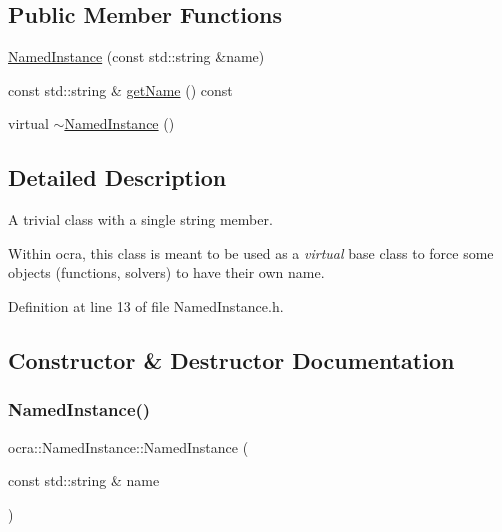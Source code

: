 \subsection*{Public Member Functions}
\begin{DoxyCompactItemize}
\item 
\hyperlink{classocra_1_1NamedInstance_a561d3cf2c7b1120ff3160c55ec89afbb}{Named\+Instance} (const std\+::string \&name)
\item 
const std\+::string \& \hyperlink{classocra_1_1NamedInstance_a8ef1a2cbd11f1308774eff3f61c53ae1}{get\+Name} () const
\item 
virtual \hyperlink{classocra_1_1NamedInstance_a0caaa1040def535f34f527b7f7f590cf}{$\sim$\+Named\+Instance} ()
\end{DoxyCompactItemize}


\subsection{Detailed Description}
A trivial class with a single string member.

Within ocra, this class is meant to be used as a {\itshape virtual} base class to force some objects (functions, solvers) to have their own name. 

Definition at line 13 of file Named\+Instance.\+h.



\subsection{Constructor \& Destructor Documentation}
\hypertarget{classocra_1_1NamedInstance_a561d3cf2c7b1120ff3160c55ec89afbb}{}\label{classocra_1_1NamedInstance_a561d3cf2c7b1120ff3160c55ec89afbb} 
\subsubsection{\texorpdfstring{Named\+Instance()}{NamedInstance()}}
{\footnotesize\ttfamily ocra\+::\+Named\+Instance\+::\+Named\+Instance (\begin{DoxyParamCaption}\item[{const std\+::string \&}]{name }\end{DoxyParamCaption})}



